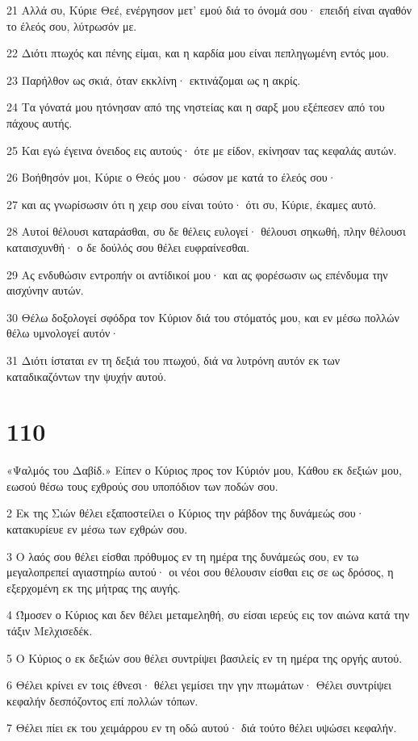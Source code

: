 \par 21 Αλλά συ, Κύριε Θεέ, ενέργησον μετ' εμού διά το όνομά σου· επειδή είναι αγαθόν το έλεός σου, λύτρωσόν με.
\par 22 Διότι πτωχός και πένης είμαι, και η καρδία μου είναι πεπληγωμένη εντός μου.
\par 23 Παρήλθον ως σκιά, όταν εκκλίνη· εκτινάζομαι ως η ακρίς.
\par 24 Τα γόνατά μου ητόνησαν από της νηστείας και η σαρξ μου εξέπεσεν από του πάχους αυτής.
\par 25 Και εγώ έγεινα όνειδος εις αυτούς· ότε με είδον, εκίνησαν τας κεφαλάς αυτών.
\par 26 Βοήθησόν μοι, Κύριε ο Θεός μου· σώσον με κατά το έλεός σου·
\par 27 και ας γνωρίσωσιν ότι η χειρ σου είναι τούτο· ότι συ, Κύριε, έκαμες αυτό.
\par 28 Αυτοί θέλουσι καταράσθαι, συ δε θέλεις ευλογεί· θέλουσι σηκωθή, πλην θέλουσι καταισχυνθή· ο δε δούλός σου θέλει ευφραίνεσθαι.
\par 29 Ας ενδυθώσιν εντροπήν οι αντίδικοί μου· και ας φορέσωσιν ως επένδυμα την αισχύνην αυτών.
\par 30 Θέλω δοξολογεί σφόδρα τον Κύριον διά του στόματός μου, και εν μέσω πολλών θέλω υμνολογεί αυτόν·
\par 31 Διότι ίσταται εν τη δεξιά του πτωχού, διά να λυτρόνη αυτόν εκ των καταδικαζόντων την ψυχήν αυτού.

\chapter{110}

\par «Ψαλμός του Δαβίδ.» Είπεν ο Κύριος προς τον Κύριόν μου, Κάθου εκ δεξιών μου, εωσού θέσω τους εχθρούς σου υποπόδιον των ποδών σου.
\par 2 Εκ της Σιών θέλει εξαποστείλει ο Κύριος την ράβδον της δυνάμεώς σου· κατακυρίευε εν μέσω των εχθρών σου.
\par 3 Ο λαός σου θέλει είσθαι πρόθυμος εν τη ημέρα της δυνάμεώς σου, εν τω μεγαλοπρεπεί αγιαστηρίω αυτού· οι νέοι σου θέλουσιν είσθαι εις σε ως δρόσος, η εξερχομένη εκ της μήτρας της αυγής.
\par 4 Ώμοσεν ο Κύριος και δεν θέλει μεταμεληθή, συ είσαι ιερεύς εις τον αιώνα κατά την τάξιν Μελχισεδέκ.
\par 5 Ο Κύριος ο εκ δεξιών σου θέλει συντρίψει βασιλείς εν τη ημέρα της οργής αυτού.
\par 6 Θέλει κρίνει εν τοις έθνεσι· θέλει γεμίσει την γην πτωμάτων· Θέλει συντρίψει κεφαλήν δεσπόζοντος επί πολλών τόπων.
\par 7 Θέλει πίει εκ του χειμάρρου εν τη οδώ αυτού· διά τούτο θέλει υψώσει κεφαλήν.

